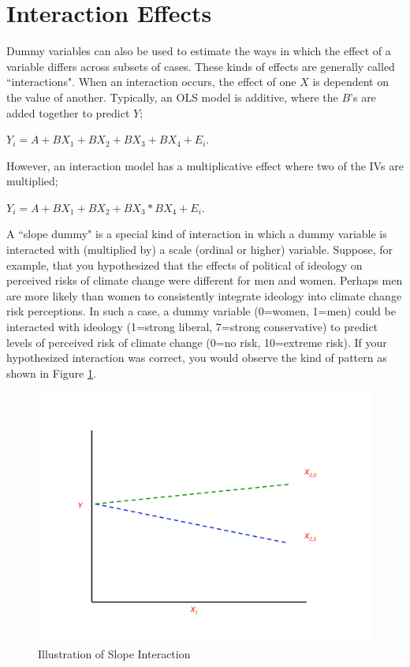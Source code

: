 \documentclass[11pt,openany]{book}\usepackage[]{graphicx}\usepackage[]{color}
\begin{document}
\section{Interaction Effects}

Dummy variables can also be used to estimate the ways in which the effect of a variable differs across subsets of cases. These kinds of effects are generally called ``interactions".  When an interaction occurs, the effect of one $X$ is dependent on the value of another. Typically, an OLS model is additive, where the $B$'s are added together to predict $Y$; 

  $Y_i = A + BX_1 + BX_2 + BX_3 + BX_4 + E_i$. 
  
However, an interaction model has a multiplicative effect where two of the IVs are multiplied;

  $Y_i = A + BX_1 + BX_2 + BX_3 * BX_4 + E_i$. 

A ``slope dummy" is a special kind of interaction in which a dummy variable  is interacted with (multiplied by) a scale (ordinal or higher) variable. Suppose, for example, that you hypothesized that the effects of political of ideology on perceived risks of climate change were different for men and women. Perhaps men are more likely than women to consistently integrate ideology into climate change risk perceptions. In such a case, a dummy variable (0=women, 1=men) could be interacted with ideology (1=strong liberal, 7=strong conservative) to predict levels of perceived risk of climate change (0=no risk, 10=extreme risk).  If your hypothesized interaction was correct, you would observe the kind of pattern as shown in Figure \ref{fig:dumin}. 

\begin{figure}
  \centering
  \includegraphics[width=5in]{14_Topics/duminter.pdf}
  \caption {Illustration of Slope Interaction \label{fig:dumin}}
\end{figure}
\end{document}
